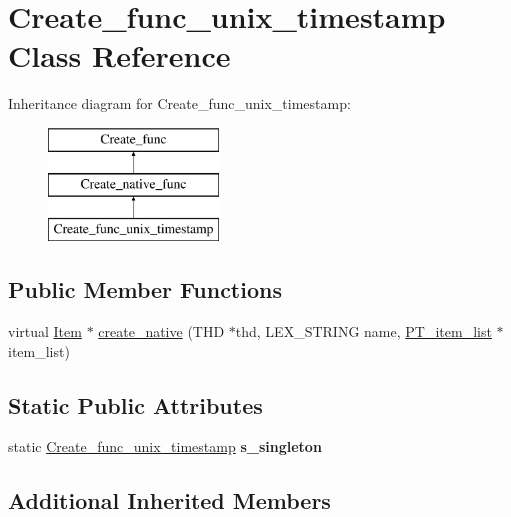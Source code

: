 \hypertarget{classCreate__func__unix__timestamp}{}\section{Create\+\_\+func\+\_\+unix\+\_\+timestamp Class Reference}
\label{classCreate__func__unix__timestamp}
Inheritance diagram for Create\+\_\+func\+\_\+unix\+\_\+timestamp\+:\begin{figure}[H]
\begin{center}
\leavevmode
\includegraphics[height=3.000000cm]{classCreate__func__unix__timestamp}
\end{center}
\end{figure}
\subsection*{Public Member Functions}
\begin{DoxyCompactItemize}
\item 
virtual \mbox{\hyperlink{classItem}{Item}} $\ast$ \mbox{\hyperlink{classCreate__func__unix__timestamp_a548121860625597d1a279e92b1878bd3}{create\+\_\+native}} (T\+HD $\ast$thd, L\+E\+X\+\_\+\+S\+T\+R\+I\+NG name, \mbox{\hyperlink{classPT__item__list}{P\+T\+\_\+item\+\_\+list}} $\ast$item\+\_\+list)
\end{DoxyCompactItemize}
\subsection*{Static Public Attributes}
\begin{DoxyCompactItemize}
\item 
\mbox{\label{classCreate__func__unix__timestamp_a1a76b47832ff389d0cbba4851a2a37af}} 
static \mbox{\hyperlink{classCreate__func__unix__timestamp}{Create\+\_\+func\+\_\+unix\+\_\+timestamp}} {\bfseries s\+\_\+singleton}
\end{DoxyCompactItemize}
\subsection*{Additional Inherited Members}


